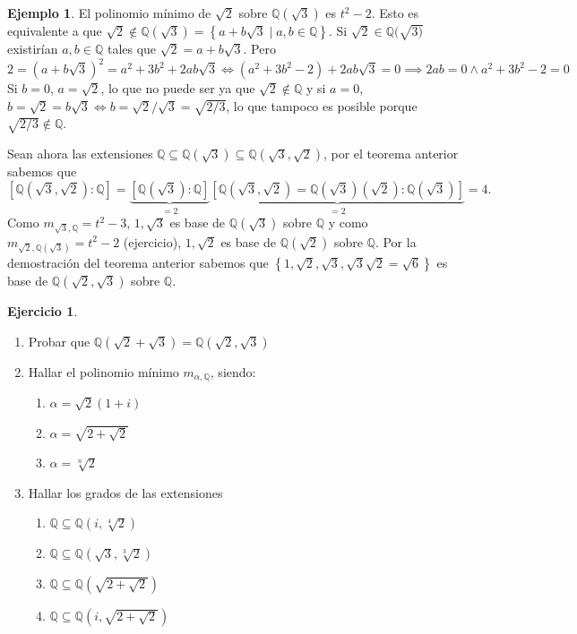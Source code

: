 \documentclass[10pt, spanish]{report}
\theoremstyle{definition}
\newtheorem*{ej}{Ejemplo}
\newtheorem*{ejer}{Ejercicio}
\newcommand{\Q}{\mathbb{Q}}
\begin{document}
\begin{ej}
    El polinomio mínimo de $\sqrt{2}$ sobre $\Q(\sqrt{3})$ es
    $t^2-2$. Esto es equivalente a que
    $\sqrt{2}\not\in\Q(\sqrt{3})=\left\{ a+b\sqrt{3}\mid a,b\in\Q\right\}$. Si
    $\sqrt{2}\in\Q(\sqrt{3)}$ existirían $a,b\in\Q$ tales que
    $\sqrt{2}=a+b\sqrt{3}$. Pero \[2=(a+b\sqrt{3})^2=a^2+3b^2+2ab\sqrt{3}
        \Leftrightarrow (a^2+3b^2-2)+2ab\sqrt{3}=0 \implies 2ab=0 \wedge
        a^2+3b^2-2=0\]
     Si $b=0$, $a=\sqrt{2}$, lo que no puede ser ya que $\sqrt{2}\not\in\Q$ y
     si $a=0$, $b=\sqrt{2}=b\sqrt{3} \Leftrightarrow b={\sqrt{2}}/{\sqrt{3}}=
     \sqrt{{2}/{3}}$, lo que tampoco es posible porque $\sqrt{{2}/{3}}\not\in\Q$.

    Sean ahora las extensiones $\Q\subseteq\Q(\sqrt{3})\subseteq
    \Q(\sqrt{3},\sqrt{2})$, por el teorema anterior sabemos que
    \[[\Q(\sqrt{3},\sqrt{2}):\Q]=\underbrace{[\Q(\sqrt{3}):\Q]}_{=2}\underbrace{
      [\Q(\sqrt{3},\sqrt{2})=\Q(\sqrt{3})(\sqrt{2}):\Q(\sqrt{3})]}_{=2}=4.\]
    Como $m_{\sqrt{3},\Q}=t^2-3$, $1,\sqrt{3}$ es base de $\Q(\sqrt{3})$ sobre
    $\Q$ y como $m_{\sqrt{2},\Q(\sqrt{3})}=t^2-2$ (ejercicio), $1,\sqrt{2}$ es
    base de $\Q(\sqrt{2})$ sobre $\Q$. Por la demostración del teorema anterior
    sabemos que $\left\{1,\sqrt{2},\sqrt{3},\sqrt{3}\sqrt{2}=\sqrt{6}\right\}$
    es base de $\Q(\sqrt{2},\sqrt{3})$ sobre $\Q$.
\end{ej}

\begin{ejer}\hspace{0pt}
    \begin{enumerate}
        \item Probar que $\Q(\sqrt{2}+\sqrt{3})=\Q(\sqrt{2},\sqrt{3})$
        \item Hallar el polinomio mínimo $m_{\alpha,\Q}$, siendo:
            \begin{multicols}{4}
                \begin{enumerate}
                    \item $\alpha=\sqrt{2}(1+i)$
                    \item $\alpha=\sqrt{2+\sqrt{2}}$
                    \item $\alpha=\sqrt[n]{2}$
                \end{enumerate}
            \end{multicols}
        \item Hallar los grados de las extensiones
            \begin{multicols}{2}
                \begin{enumerate}
                    \item $\Q\subseteq\Q(i,\sqrt[4]{2})$
                    \item $\Q\subseteq\Q\left(\sqrt{3},\sqrt[3]{2}\right)$
                    \item $\Q\subseteq\Q\left(\sqrt{2+\sqrt{2}}\right)$
                    \item $\Q\subseteq\Q\left(i,\sqrt{2+\sqrt{2}}\right)$
                \end{enumerate}
            \end{multicols}
    \end{enumerate}
\end{ejer}
\end{document}

